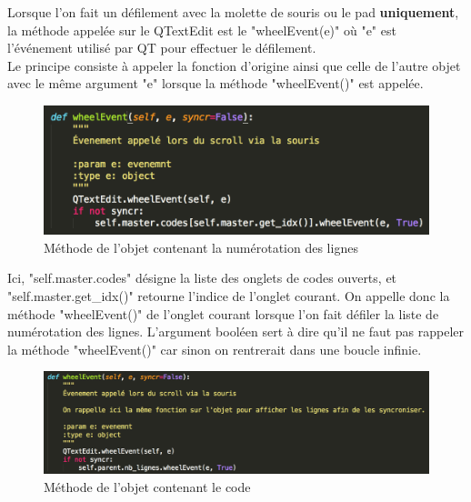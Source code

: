 \documentclass[a4paper,12pt]{article}
\begin{document}
		Lorsque l'on fait un défilement avec la molette de souris ou le pad \textbf{uniquement}, la méthode appelée sur le QTextEdit est le "wheelEvent(e)" où "e" est l'événement utilisé par QT pour effectuer le défilement.\\
		
		Le principe consiste à appeler la fonction d'origine ainsi que celle de l'autre objet avec le même argument "e" lorsque la méthode "wheelEvent()" est appelée.
		
		
		\begin{figure}[h!]
			\begin{center}
				\includegraphics[scale=0.9]{images/imgs_lines/wheel_lines}
				\caption{Méthode de l'objet contenant la numérotation des lignes}
			\end{center}
		\end{figure}
		
		
		Ici, "self.master.codes" désigne la liste des onglets de codes ouverts, et "self.master.get\_idx()" retourne l'indice de l'onglet courant. On appelle donc la méthode "wheelEvent()" de l'onglet courant lorsque l'on fait défiler la liste de numérotation des lignes. L'argument booléen sert à dire qu'il ne faut pas rappeler la méthode "wheelEvent()" car sinon on rentrerait dans une boucle infinie.\\
		
		\begin{figure}[h!]
			\begin{center}
				\includegraphics[scale=0.7]{images/imgs_lines/wheel_code}
				\caption{Méthode de l'objet contenant le code}
			\end{center}
		\end{figure}
		
\end{document}
